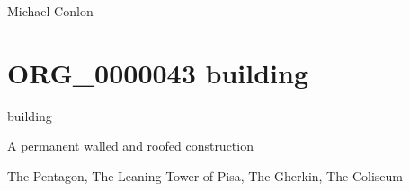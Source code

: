 \documentclass[letterpaper,10pt,english]{sphinxmanual}
\begin{document}
\begin{sphinxShadowBox}

\sphinxAtStartPar
Michael Conlon 
\end{sphinxShadowBox}

\begin{sphinxShadowBox}

\sphinxAtStartPar
{}
\end{sphinxShadowBox}
\begin{quote}
\label{\detokenize{doc-ORG_0000043:org-0000043}}\label{\detokenize{doc-ORG_0000043:building}}\label{\detokenize{doc-ORG_0000043:org-0000043}}
\ignorespaces \end{quote}


\section{ORG\_0000043 \sphinxhyphen{} building}
\label{\detokenize{doc-ORG_0000043:org-0000043-building}}\label{\detokenize{doc-ORG_0000043:index-0}}\label{\detokenize{doc-ORG_0000043::doc}}
\begin{sphinxShadowBox}

\sphinxAtStartPar
building
\end{sphinxShadowBox}

\begin{sphinxShadowBox}

\sphinxAtStartPar
A permanent walled and roofed construction
\end{sphinxShadowBox}

\begin{sphinxShadowBox}

\sphinxAtStartPar
{}
\end{sphinxShadowBox}

\begin{sphinxShadowBox}

\sphinxAtStartPar
The Pentagon, The Leaning Tower of Pisa, The Gherkin, The Coliseum
\end{sphinxShadowBox}
\end{document}
